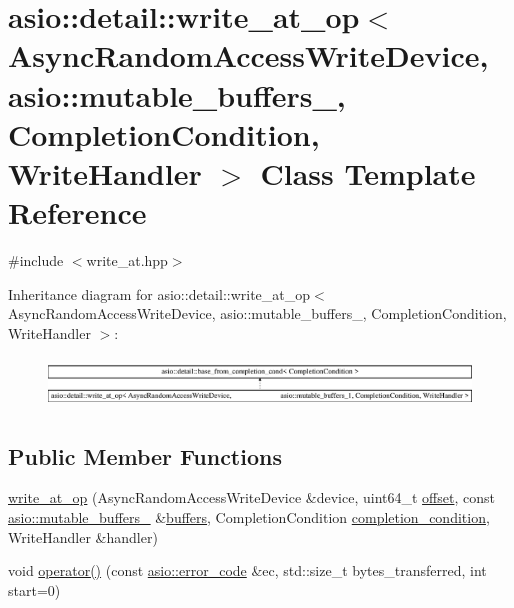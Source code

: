 \hypertarget{classasio_1_1detail_1_1write__at__op_3_01_async_random_access_write_device_00_01_01_01_01_01_01_9c63ca7e3422e806874cb49cd5be5156}{}\section{asio\+:\+:detail\+:\+:write\+\_\+at\+\_\+op$<$ Async\+Random\+Access\+Write\+Device, asio\+:\+:mutable\+\_\+buffers\+\_, Completion\+Condition, Write\+Handler $>$ Class Template Reference}
\label{classasio_1_1detail_1_1write__at__op_3_01_async_random_access_write_device_00_01_01_01_01_01_01_9c63ca7e3422e806874cb49cd5be5156}


{\ttfamily \#include $<$write\+\_\+at.\+hpp$>$}

Inheritance diagram for asio\+:\+:detail\+:\+:write\+\_\+at\+\_\+op$<$ Async\+Random\+Access\+Write\+Device, asio\+:\+:mutable\+\_\+buffers\+\_, Completion\+Condition, Write\+Handler $>$\+:\begin{figure}[H]
\begin{center}
\leavevmode
\includegraphics[height=1.325444cm]{classasio_1_1detail_1_1write__at__op_3_01_async_random_access_write_device_00_01_01_01_01_01_01_9c63ca7e3422e806874cb49cd5be5156}
\end{center}
\end{figure}
\subsection*{Public Member Functions}
\begin{DoxyCompactItemize}
\item 
\hyperlink{classasio_1_1detail_1_1write__at__op_3_01_async_random_access_write_device_00_01_01_01_01_01_01_9c63ca7e3422e806874cb49cd5be5156_aaba79692cd54e5ff5fe47ca61a3e2a97}{write\+\_\+at\+\_\+op} (Async\+Random\+Access\+Write\+Device \&device, uint64\+\_\+t \hyperlink{group__async__read__at_ga8dcdb41a4adfd6fe5322b5dd666d9f29}{offset}, const \hyperlink{classasio_1_1mutable__buffers__1}{asio\+::mutable\+\_\+buffers\+\_} \&\hyperlink{group__async__read_ga54dede45c3175148a77fe6635222c47d}{buffers}, Completion\+Condition \hyperlink{group__async__read_gae2e215d5013596cc2b385bb6c13fa518}{completion\+\_\+condition}, Write\+Handler \&handler)
\item 
void \hyperlink{classasio_1_1detail_1_1write__at__op_3_01_async_random_access_write_device_00_01_01_01_01_01_01_9c63ca7e3422e806874cb49cd5be5156_afdbdba04bcb558fd483d10562ddd89fc}{operator()} (const \hyperlink{classasio_1_1error__code}{asio\+::error\+\_\+code} \&ec, std\+::size\+\_\+t bytes\+\_\+transferred, int start=0)
\end{DoxyCompactItemize}
